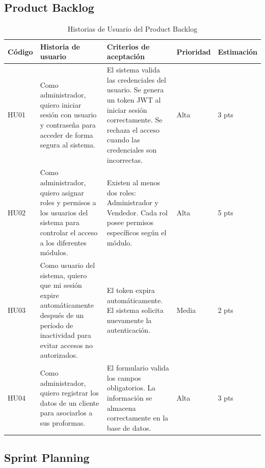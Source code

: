 \subsection{Product Backlog}
\begin{table}[H]
\centering
\caption{Historias de Usuario del Product Backlog}
\label{tab:product_backlog}
\begin{tabular}{@{}p{1.3cm}p{4.5cm}p{4.5cm}p{1.5cm}p{1.8cm}@{}}
\toprule
\textbf{Código} & \textbf{Historia de usuario} & \textbf{Criterios de aceptación} & \textbf{Prioridad} & \textbf{Estimación} \\
\midrule
HU01 & Como administrador, quiero iniciar sesión con usuario y contraseña para acceder de forma segura al sistema. & 
El sistema valida las credenciales del usuario. Se genera un token JWT al iniciar sesión correctamente. Se rechaza el acceso cuando las credenciales son incorrectas. & 
Alta & 3 pts \\
\midrule
HU02 & Como administrador, quiero asignar roles y permisos a los usuarios del sistema para controlar el acceso a los diferentes módulos. & 
Existen al menos dos roles: Administrador y Vendedor. Cada rol posee permisos específicos según el módulo. & 
Alta & 5 pts \\
\midrule
HU03 & Como usuario del sistema, quiero que mi sesión expire automáticamente después de un período de inactividad para evitar accesos no autorizados. & 
El token expira automáticamente. El sistema solicita nuevamente la autenticación. & 
Media & 2 pts \\
\midrule
HU04 & Como administrador, quiero registrar los datos de un cliente para asociarlos a sus proformas. & 
El formulario valida los campos obligatorios. La información se almacena correctamente en la base de datos. & 
Alta & 3 pts \\
\bottomrule
\end{tabular}
\end{table}

\subsection{Sprint Planning}

